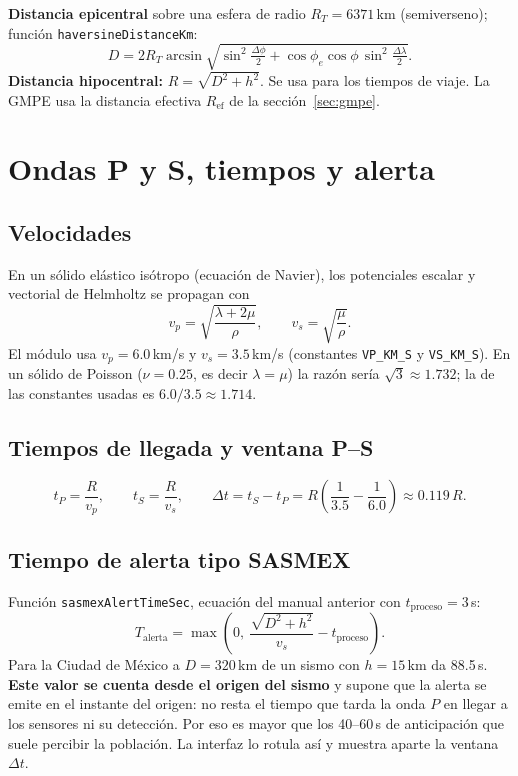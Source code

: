 \documentclass[11pt,a4paper]{article}
\begin{document}
\textbf{Distancia epicentral} sobre una esfera de radio $R_T = 6371$\,km (semiverseno);
función \texttt{haversineDistanceKm}:
\begin{equation}
  D = 2R_T \arcsin\sqrt{\sin^2\tfrac{\Delta\phi}{2} + \cos\phi_e\cos\phi\,\sin^2\tfrac{\Delta\lambda}{2}} .
  \label{eq:haversine}
\end{equation}
\textbf{Distancia hipocentral:} $R = \sqrt{D^2 + h^2}$. Se usa para los tiempos de viaje. La GMPE usa
la distancia efectiva $R_{\mathrm{ef}}$ de la sección~\ref{sec:gmpe}.

\section{Ondas P y S, tiempos y alerta}

\subsection{Velocidades}
En un sólido elástico isótropo (ecuación de Navier), los potenciales escalar y vectorial de
Helmholtz se propagan con
\begin{equation}
  v_p = \sqrt{\frac{\lambda + 2\mu}{\rho}}, \qquad v_s = \sqrt{\frac{\mu}{\rho}} .
\end{equation}
El módulo usa $v_p = 6.0$\,km/s y $v_s = 3.5$\,km/s (constantes \texttt{VP\_KM\_S} y
\texttt{VS\_KM\_S}). En un sólido de Poisson ($\nu = 0.25$, es decir $\lambda = \mu$) la razón sería
$\sqrt{3}\approx 1.732$; la de las constantes usadas es $6.0/3.5 \approx 1.714$.

\subsection{Tiempos de llegada y ventana P--S}
\begin{equation}
  t_P = \frac{R}{v_p}, \qquad t_S = \frac{R}{v_s}, \qquad \Delta t = t_S - t_P = R\left(\frac{1}{3.5} - \frac{1}{6.0}\right) \approx 0.119\,R .
\end{equation}

\subsection{Tiempo de alerta tipo SASMEX}
Función \texttt{sasmexAlertTimeSec}, ecuación del manual anterior con $t_{\mathrm{proceso}} = 3$\,s:
\begin{equation}
  T_{\mathrm{alerta}} = \max\!\left(0,\ \frac{\sqrt{D^2 + h^2}}{v_s} - t_{\mathrm{proceso}}\right).
  \label{eq:alerta}
\end{equation}
Para la Ciudad de México a $D = 320$\,km de un sismo con $h = 15$\,km da 88.5\,s. \textbf{Este valor se
cuenta desde el origen del sismo} y supone que la alerta se emite en el instante del origen: no resta
el tiempo que tarda la onda $P$ en llegar a los sensores ni su detección. Por eso es mayor que los
40--60\,s de anticipación que suele percibir la población. La interfaz lo rotula así y muestra aparte
la ventana $\Delta t$.
\end{document}
